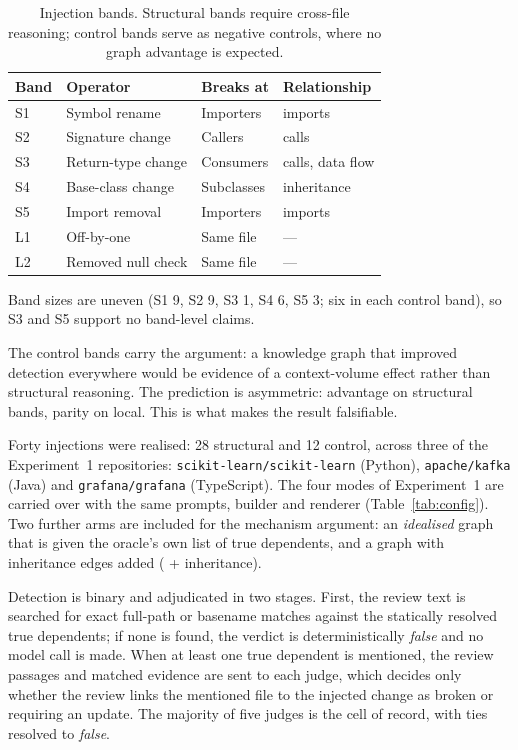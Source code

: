 \begin{table}[htbp]
    \centering
    \caption{Injection bands. Structural bands require cross-file reasoning;
             control bands serve as negative controls, where no graph
             advantage is expected.}
    \label{tab:injection-bands}
    \small
    \begin{tabular}{llll}
        \toprule
        Band & Operator & Breaks at & Relationship \\
        \midrule
        S1 & Symbol rename          & Importers          & imports \\
        S2 & Signature change       & Callers            & calls \\
        S3 & Return-type change     & Consumers          & calls, data flow \\
        S4 & Base-class change      & Subclasses         & inheritance \\
        S5 & Import removal         & Importers          & imports \\
        \midrule
        L1 & Off-by-one             & Same file          & --- \\
        L2 & Removed null check     & Same file          & --- \\
        \bottomrule
    \end{tabular}
\end{table}

Band sizes are uneven (S1 9, S2 9, S3 1, S4 6, S5 3; six in each control
band), so S3 and S5 support no band-level claims.

The control bands carry the argument: a knowledge graph that improved detection
everywhere would be evidence of a context-volume effect rather than structural
reasoning. The prediction is asymmetric: advantage on structural bands,
parity on local. This is what makes the result falsifiable.

Forty injections were realised: 28 structural and 12 control, across three
of the Experiment~1 repositories: \texttt{scikit-learn/scikit-learn}
(Python), \texttt{apache/kafka} (Java) and \texttt{grafana/grafana}
(TypeScript). The four modes of Experiment~1 are carried over with the same
prompts, builder and renderer (Table~\ref{tab:config}). Two further arms are
included for the mechanism argument: an \emph{idealised} graph that is given
the oracle's own list of true dependents, and a graph with inheritance edges
added (\kg{} + inheritance).

Detection is binary and adjudicated in two stages. First, the review text is
searched for exact full-path or basename matches against the statically
resolved true dependents; if none is found, the verdict is deterministically
\emph{false} and no model call is made. When at least one true dependent is
mentioned, the review passages and matched evidence are sent to each judge,
which decides only whether the review links the mentioned file to the injected
change as broken or requiring an update. The majority of five judges is the
cell of record, with ties resolved to \emph{false}.

